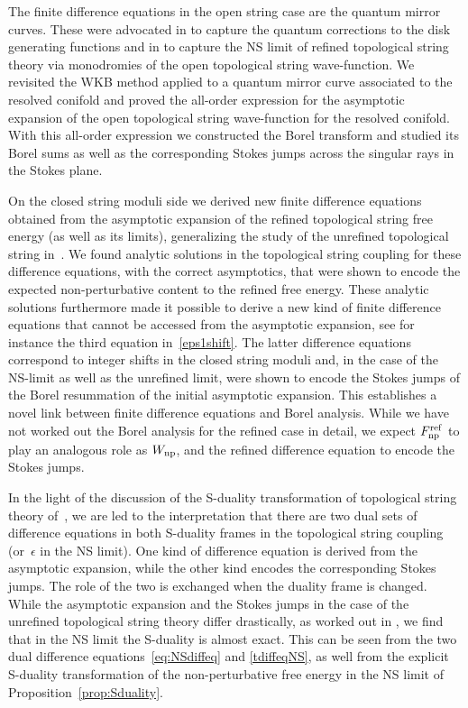 \documentclass[pdftex]{sigma}
\numberwithin{equation}{section}
\begin{document}
The finite difference equations in the open string case are the quantum mirror curves. These were advocated in \cite{ADKMV} to capture the quantum corrections to the disk generating functions \cite{Aganagic:2000gs} and in \cite{ACDKV} to capture the NS limit of refined topological string theory via monodromies of the open topological string wave-function. We revisited the WKB method applied to a quantum mirror curve associated to the resolved conifold and proved the all-order expression for the asymptotic expansion of the open topological string wave-function for the resolved conifold. With this all-order expression we constructed the Borel transform and studied its Borel sums as well as the corresponding Stokes jumps across the singular rays in the Stokes plane.

On the closed string moduli side we derived new finite difference equations obtained from the asymptotic expansion of the refined topological string free energy (as well as its limits), generalizing the study of the unrefined topological string in~\cite{alim2020difference}. We found analytic solutions in the topological string coupling for these difference equations, with the correct asymptotics, that were shown to encode the expected non-perturbative content to the refined free energy. These analytic solutions furthermore made it possible to derive a new kind of finite difference equations that cannot be accessed from the asymptotic expansion, see for instance the third equation in~\eqref{eps1shift}. The latter difference equations correspond to integer shifts in the closed string moduli and, in the case of the NS-limit as well as the unrefined limit, were shown to encode the Stokes jumps of the Borel resummation of the initial asymptotic expansion. This establishes a novel link between finite difference equations and Borel analysis. While we have not worked out the Borel analysis for the refined case in detail, we expect $F_{{\rm np}}^{\rm ref}$ to play an analogous role as $W_{{\rm np}}$, and the refined difference equation to encode the Stokes jumps.

In the light of the discussion of the S-duality transformation of topological string theory of~\cite{ASTT21}, we are led to the interpretation that there are two dual sets of difference equations in both S-duality frames in the topological string coupling (or~$\epsilon$ in the NS limit). One kind of difference equation is derived from the asymptotic expansion, while the other kind encodes the corresponding Stokes jumps. The role of the two is exchanged when the duality frame is changed. While the asymptotic expansion and the Stokes jumps in the case of the unrefined topological string theory differ drastically, as worked out in \cite{ASTT21}, we find that in the NS limit the S-duality is almost exact. This can be seen from the two dual difference equations~\eqref{eq:NSdiffeq} and \eqref{tdiffeqNS}, as well from the explicit S-duality transformation of the non-perturbative free energy in the NS limit of Proposition~\ref{prop:Sduality}.
\end{document}
